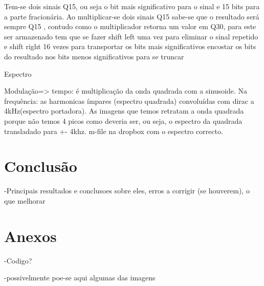 \documentclass[11pt]{article}
\begin{document}
Tem-se dois sinais Q15, ou seja o bit mais significativo para o sinal e 15 bits para a parte fracionária. Ao multiplicar-se dois sinais Q15 sabe-se que o resultado será sempre Q15
, contudo como o multiplicador retorna um valor em Q30, para este ser armazenado tem que se fazer shift left uma vez para eliminar o sinal repetido e shift right 16 vezes para transportar os bits mais significativos encostar os bits do resultado nos bits menos significativos para se truncar




Espectro

Modulação=> tempo: é multiplicação da onda quadrada com a sinusoide. Na frequência: as harmonicas ímpares (espectro quadrada) convoluídas com dirac a 4kHz(espectro portadora).
As imagens que temos retratam a onda quadrada porque não temos 4 picos como deveria ser, ou seja, o espectro da quadrada transladado para +- 4khz. m-file na dropbox com o espectro correcto.


\section{Conclusão}
-Principais resultados e conclusoes sobre eles, erros a corrigir (se houverem), o que melhorar

\section{Anexos}
-Codigo?

-possivelmente poe-se aqui algumas das imagens	
\end{document}
